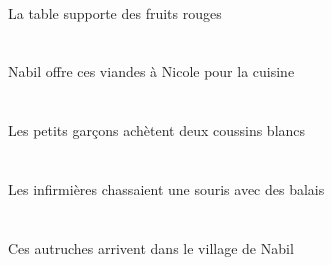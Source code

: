 \begin{exe}
\DEFSgErgG{}   \tableDSgErgG{}   \INDPlAbsG{}   \rougeAPlG{}   \fruitAPlAbsG{}  \supporterVtPrsAPlG{}\\
La table supporte des fruits rouges
\ex\glll
\DEFSgObl{}   \cuisineDSgObl{}   \POUR{}   \INDSgErg{}   \NabilDSgErg{}    \INDSgDat{}   \NicoleBSgDat{}   \DEMPlAbs{}   \viandeAPlAbs{}  \offrirVdPrsAPl{}\\
\DEFSgOblP{}   \cuisineDSgOblP{}   \POURP{}   \INDSgErgP{}   \NabilDSgErgP{}    \INDSgDatP{}   \NicoleBSgDatP{}   \DEMPlAbsP{}   \viandeAPlAbsP{}  \offrirVdPrsAPlP{}\\
\DEFSgOblG{}   \cuisineDSgOblG{}   \POURG{}   \INDSgErgG{}   \NabilDSgErgG{}    \INDSgDatG{}   \NicoleBSgDatG{}   \DEMPlAbsG{}   \viandeAPlAbsG{}  \offrirVdPrsAPlG{}\\
Nabil offre ces viandes à Nicole pour la cuisine
\ex\glll
\DEFPlErg{}   \petitDPl{}   \garconDPlErg{}   \INDDuAbs{}   \blancBDu{}   \coussinBDuAbs{}  \acheterVtPrsBDu{}\\
\DEFPlErgP{}   \petitDPlP{}   \garconDPlErgP{}   \INDDuAbsP{}   \blancBDuP{}   \coussinBDuAbsP{}  \acheterVtPrsBDuP{}\\
\DEFPlErgG{}   \petitDPlG{}   \garconDPlErgG{}   \INDDuAbsG{}   \blancBDuG{}   \coussinBDuAbsG{}  \acheterVtPrsBDuG{}\\
Les petits garçons achètent deux coussins blancs
\ex\glll
\DEFPlErg{}   \infirmiereAPlErg{}    \INDPlObl{}   \balaiAPlObl{}   \AVEC{}   \INDSgAbs{}   \sourisBSgAbs{}  \chasserVtPstBSg{}\\
\DEFPlErgP{}   \infirmiereAPlErgP{}    \INDPlOblP{}   \balaiAPlOblP{}   \AVECP{}   \INDSgAbsP{}   \sourisBSgAbsP{}  \chasserVtPstBSgP{}\\
\DEFPlErgG{}   \infirmiereAPlErgG{}    \INDPlOblG{}   \balaiAPlOblG{}   \AVECG{}   \INDSgAbsG{}   \sourisBSgAbsG{}  \chasserVtPstBSgG{}\\
Les infirmières chassaient une souris avec des balais
\ex\glll
\DEMPlAbs{}   \autrucheBPlAbs{}    \DEFSgObl{}    \INDSgObl{}   \NabilDSgObl{}   \DE{}   \villageCSgObl{}   \DANS{}  \arriverViPrsBPl{}\\
\DEMPlAbsP{}   \autrucheBPlAbsP{}    \DEFSgOblP{}    \INDSgOblP{}   \NabilDSgOblP{}   \DEP{}   \villageCSgOblP{}   \DANSP{}  \arriverViPrsBPlP{}\\
\DEMPlAbsG{}   \autrucheBPlAbsG{}    \DEFSgOblG{}    \INDSgOblG{}   \NabilDSgOblG{}   \DEG{}   \villageCSgOblG{}   \DANSG{}  \arriverViPrsBPlG{}\\
Ces autruches arrivent dans le village de Nabil
\ex\glll
\DEFSgObl{}   \maisonDSgObl{}   \DEVANT{}   \DEFPlErg{}   \chasseurCPlErg{}    \DEFDuDat{}   \petitCDu{}   \filleCDuDat{}   \INDSgAbs{}   \autrucheBSgAbs{}  \montrerVdPstBSg{}\\

\end{exe}
